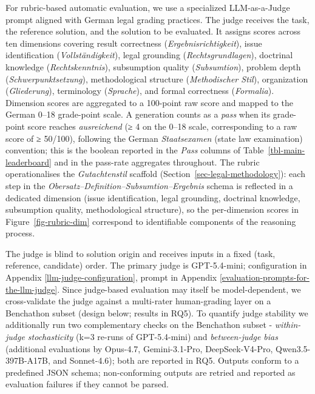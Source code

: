 \documentclass[11pt]{article}
\begin{document}
For rubric-based automatic evaluation, we use a specialized
LLM-as-a-Judge prompt aligned with German legal grading practices. The
judge receives the task, the reference solution, and the solution to be
evaluated. It assigns scores across ten dimensions covering result
correctness (\emph{Ergebnisrichtigkeit}), issue identification
(\emph{Vollständigkeit}), legal grounding (\emph{Rechtsgrundlagen}),
doctrinal knowledge (\emph{Rechtskenntnis}), subsumption quality
(\emph{Subsumtion}), problem depth (\emph{Schwerpunktsetzung}),
methodological structure (\emph{Methodischer Stil}), organization
(\emph{Gliederung}), terminology (\emph{Sprache}), and formal
correctness (\emph{Formalia}). Dimension scores are aggregated to a
100-point raw score and mapped to the German 0--18 grade-point scale. A
generation counts as a \emph{pass} when its grade-point score reaches
\emph{ausreichend} (≥ 4 on the 0--18 scale, corresponding to a raw score
of ≥ 50/100), following the German \emph{Staatsexamen} (state law
examination) convention; this is the boolean reported in the \emph{Pass}
columns of Table~\ref{tbl-main-leaderboard} and in the pass-rate
aggregates throughout. The rubric operationalises the
\emph{Gutachtenstil} scaffold (Section~\ref{sec-legal-methodology}):
each step in the \emph{Obersatz--Definition--Subsumtion--Ergebnis}
schema is reflected in a dedicated dimension (issue identification,
legal grounding, doctrinal knowledge, subsumption quality,
methodological structure), so the per-dimension scores in
Figure~\ref{fig-rubric-dim} correspond to identifiable components of the
reasoning process.

The judge is blind to solution origin and receives inputs in a fixed
(task, reference, candidate) order. The primary judge is GPT-5.4-mini;
configuration in Appendix \ref{llm-judge-configuration}, prompt in
Appendix \ref{evaluation-prompts-for-the-llm-judge}. Since judge-based
evaluation may itself be model-dependent, we cross-validate the judge
against a multi-rater human-grading layer on a Benchathon subset (design
below; results in RQ5). To quantify judge stability we additionally run
two complementary checks on the Benchathon subset - \emph{within-judge
stochasticity} (k=3 re-runs of GPT-5.4-mini) and \emph{between-judge
bias} (additional evaluations by Opus-4.7, Gemini-3.1-Pro,
DeepSeek-V4-Pro, Qwen3.5-397B-A17B, and Sonnet-4.6); both are reported
in RQ5. Outputs conform to a predefined JSON schema; non-conforming
outputs are retried and reported as evaluation failures if they cannot
be parsed.
\end{document}
